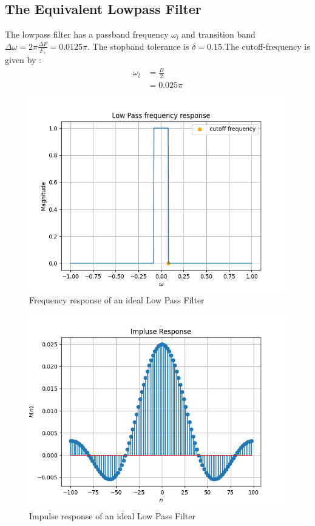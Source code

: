 \documentclass{article}
\begin{document}
\subsection{The Equivalent Lowpass Filter}
The lowpass filter has a passband frequency $\omega_l$ and transition band $\Delta \omega = 2\pi \frac{\Delta F}{F_s} = 0.0125\pi$.
The stopband tolerance is $\delta=0.15$.The cutoff-frequency is given by :
\begin{align}
    \omega_{l} &= \frac{B}{2}\\
                &= 0.025\pi
\end{align}
\begin{figure}[h!]
\centering
\includegraphics[width=1\columnwidth]{figs/FIR_ideal_w.png}
\caption{Frequency response of an ideal Low Pass Filter}
\label{fig:LPF_FIR_1}
\end{figure}
\begin{figure}[h!]
    \centering
    \includegraphics[width=1\columnwidth]{figs/FIR_ideal_n.png}
    \caption{Impulse response of an ideal Low Pass Filter}
    \label{fig:LPF_FIR_2}
\end{figure}
\end{document}
